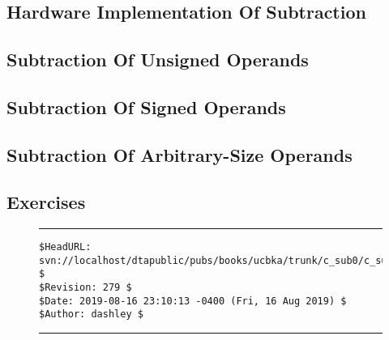 
\chapter{\csubzerolongtitle{}}

\label{csub0}

\section{Hardware Implementation Of Subtraction}

\section{Subtraction Of Unsigned Operands}

\section{Subtraction Of Signed Operands}

\section{Subtraction Of Arbitrary-Size Operands}

\section{Exercises}



\noindent\begin{figure}[!b]
\noindent\rule[-0.25in]{\textwidth}{1pt}
\begin{tiny}
\begin{verbatim}
$HeadURL: svn://localhost/dtapublic/pubs/books/ucbka/trunk/c_sub0/c_sub0.tex $
$Revision: 279 $
$Date: 2019-08-16 23:10:13 -0400 (Fri, 16 Aug 2019) $
$Author: dashley $
\end{verbatim}
\end{tiny}
\noindent\rule[0.25in]{\textwidth}{1pt}
\end{figure}

%
